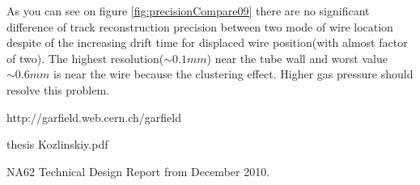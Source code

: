 \documentclass[]{article}
\begin{document}
	As you can see on figure \ref{fig:precisionCompare09} there are no significant difference of track reconstruction precision between two mode of wire location despite of the increasing drift time for displaced wire position(with almost factor of two).	 The highest resolution($\sim 0.1 mm$) near the tube wall and worst value $\sim0.6mm$ is near the wire because the clustering effect. Higher gas pressure should resolve this problem.
		
\newpage
\begin{thebibliography}{00}
	 http://garfield.web.cern.ch/garfield

	  thesis Kozlinskiy.pdf 
	
	 NA62 Technical Design Report from December 2010. 
	
\end{thebibliography}
	
\end{document}
